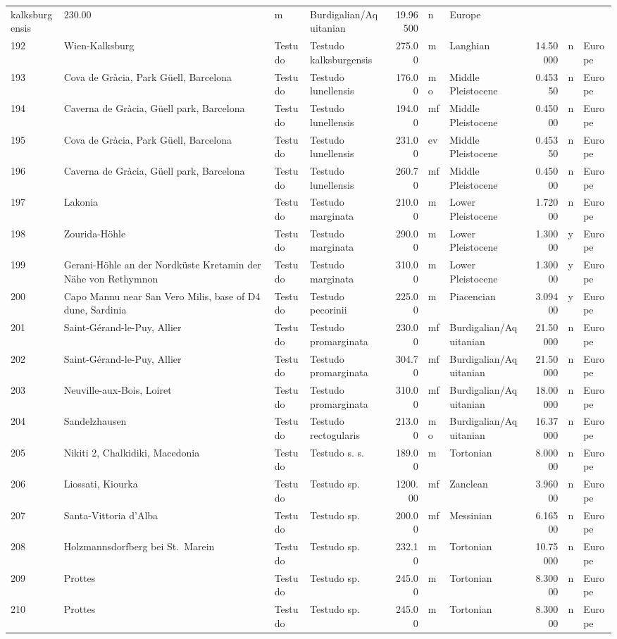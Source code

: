 \documentclass[]{article}
\begin{document}
\begin{longtable}[]{@{}llllrllrll@{}}
kalksburgensis & 230.00 & m & Burdigalian/Aquitanian & 19.96500 & n &
Europe\tabularnewline
192 & Wien-Kalksburg & Testudo & Testudo kalksburgensis & 275.00 & m &
Langhian & 14.50000 & n & Europe\tabularnewline
193 & Cova de Gràcia, Park Güell, Barcelona & Testudo & Testudo
lunellensis & 176.00 & mo & Middle Pleistocene & 0.45350 & n &
Europe\tabularnewline
194 & Caverna de Gràcia, Güell park, Barcelona & Testudo & Testudo
lunellensis & 194.00 & mf & Middle Pleistocene & 0.45000 & n &
Europe\tabularnewline
195 & Cova de Gràcia, Park Güell, Barcelona & Testudo & Testudo
lunellensis & 231.00 & ev & Middle Pleistocene & 0.45350 & n &
Europe\tabularnewline
196 & Caverna de Gràcia, Güell park, Barcelona & Testudo & Testudo
lunellensis & 260.70 & mf & Middle Pleistocene & 0.45000 & n &
Europe\tabularnewline
197 & Lakonia & Testudo & Testudo marginata & 210.00 & m & Lower
Pleistocene & 1.72000 & n & Europe\tabularnewline
198 & Zourida-Höhle & Testudo & Testudo marginata & 290.00 & m & Lower
Pleistocene & 1.30000 & y & Europe\tabularnewline
199 & Gerani-Höhle an der Nordküste Kretamin der Nähe von Rethymnon &
Testudo & Testudo marginata & 310.00 & m & Lower Pleistocene & 1.30000 &
y & Europe\tabularnewline
200 & Capo Mannu near San Vero Milis, base of D4 dune, Sardinia &
Testudo & Testudo pecorinii & 225.00 & m & Piacencian & 3.09400 & y &
Europe\tabularnewline
201 & Saint-Gérand-le-Puy, Allier & Testudo & Testudo promarginata &
230.00 & mf & Burdigalian/Aquitanian & 21.50000 & n &
Europe\tabularnewline
202 & Saint-Gérand-le-Puy, Allier & Testudo & Testudo promarginata &
304.70 & mf & Burdigalian/Aquitanian & 21.50000 & n &
Europe\tabularnewline
203 & Neuville-aux-Bois, Loiret & Testudo & Testudo promarginata &
310.00 & mf & Burdigalian/Aquitanian & 18.00000 & n &
Europe\tabularnewline
204 & Sandelzhausen & Testudo & Testudo rectogularis & 213.00 & mo &
Burdigalian/Aquitanian & 16.37000 & n & Europe\tabularnewline
205 & Nikiti 2, Chalkidiki, Macedonia & Testudo & Testudo s. s. & 189.00
& m & Tortonian & 8.00000 & n & Europe\tabularnewline
206 & Liossati, Kiourka & Testudo & Testudo sp. & 1200.00 & mf &
Zanclean & 3.96000 & n & Europe\tabularnewline
207 & Santa-Vittoria d'Alba & Testudo & Testudo sp. & 200.00 & mf &
Messinian & 6.16500 & n & Europe\tabularnewline
208 & Holzmannsdorfberg bei St.~Marein & Testudo & Testudo sp. & 232.10
& m & Tortonian & 10.75000 & n & Europe\tabularnewline
209 & Prottes & Testudo & Testudo sp. & 245.00 & m & Tortonian & 8.30000
& n & Europe\tabularnewline
210 & Prottes & Testudo & Testudo sp. & 245.00 & m & Tortonian & 8.30000
& n & Europe\tabularnewline

\end{longtable}
\end{document}
